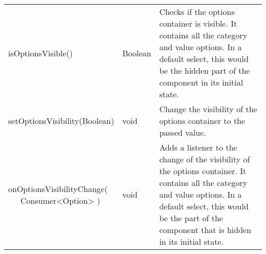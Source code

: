 \begin{table}[!htb]
\begin{tabular}{ p{5cm} p{3cm} p{4.5cm} }
        isOptionsVisible()                   & Boolean                & Checks if the options container is visible. 
                                                                        It contains all the category and value options.
                                                                        In a default select, this would be the hidden part of the component in its initial state. \\
        setOptionsVisibility(Boolean)        & void                   & Change the visibility of the options container to the passed value. \\
        \tbbr{
            onOptionsVisibilityChange( \\
                \ \ \ Consumer<Option>
            )}                               & void                   & Adds a listener to the change of the visibility of the options container. 
                                                                        It contains all the category and value options.
                                                                        In a default select, this would be the part of the component that is hidden in its initial state. \\
        \bottomrule[0.5pt]
    \end{tabular}
\end{table}

